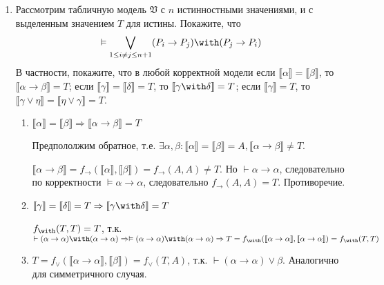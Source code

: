 

\cfoot{}



\begin{enumerate}[wide, labelwidth=!, labelindent=0pt]
    \item Рассмотрим табличную модель $\mathfrak{V}$ с $n$ истинностными значениями,
          и с выделенным значением $T$ для истины.
          Покажите, что $$\vDash\bigvee_{1 \le i\ne j \le n+1} (P_i \rightarrow P_j)\with(P_j\rightarrow P_i)$$
          В частности, покажите, что в любой корректной модели если $\llbracket\alpha\rrbracket = \llbracket\beta\rrbracket$, то
          $\llbracket\alpha\rightarrow\beta\rrbracket = T$; если $\llbracket\gamma\rrbracket = \llbracket\delta\rrbracket = T$, то
          $\llbracket\gamma\with\delta\rrbracket = T$;
          если $\llbracket\gamma\rrbracket = T$, то $\llbracket\gamma\vee\eta\rrbracket = \llbracket\eta\vee\gamma\rrbracket = T$.

          \begin{enumerate}
              \item \(\llbracket\alpha\rrbracket = \llbracket\beta\rrbracket \Rightarrow \llbracket\alpha\rightarrow\beta\rrbracket = T\)

                    Предпололжим обратное, т.е. \(\exists \alpha, \beta : \llbracket \alpha \rrbracket = \llbracket \beta \rrbracket = A, \llbracket \alpha \to \beta \rrbracket \neq T\).

                    \(\llbracket \alpha \to \beta \rrbracket = f_\to (\llbracket \alpha \rrbracket, \llbracket \beta \rrbracket) = f_{\to}(A, A) \neq T\). Но \(\vdash \alpha \to \alpha\), следовательно по корректности \(\vDash \alpha \to \alpha\), следовательно \(f_\to (A, A) = T\). Противоречие.

              \item \(\llbracket\gamma\rrbracket = \llbracket\delta\rrbracket = T \Rightarrow \llbracket\gamma\with\delta\rrbracket = T\)

                    \(f_{\with}(T, T) = T\), т.к. \(\vdash (\alpha \to \alpha) \with (\alpha \to \alpha) \Rightarrow \vDash (\alpha \to \alpha) \with (\alpha \to \alpha) \Rightarrow T = f_{\with}(\llbracket \alpha \to \alpha \rrbracket, \llbracket \alpha \to \alpha \rrbracket) = f_\with (T, T)\)

              \item \(T = f_\lor(\llbracket \alpha \to \alpha \rrbracket, \llbracket \beta \rrbracket) = f_\lor(T, A)\), т.к. \(\vdash (\alpha \to \alpha) \lor \beta\). Аналогично для симметричного случая.
          \end{enumerate}


\end{enumerate}
